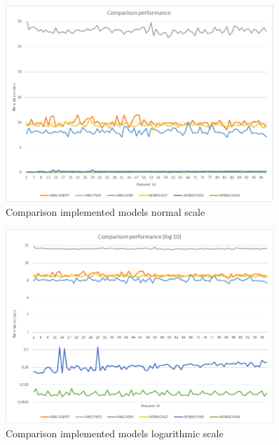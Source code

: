 \begin{figure}[h]
    \centering
    \includegraphics[width=0.9\textwidth, height=0.6\textwidth]{Img/Performance/Perf.png}
    \caption{Comparison implemented models normal scale}
\end{figure}
\begin{figure}[h]
    \centering
    \includegraphics[width=0.9\textwidth, height=0.6\textwidth]{Img/Performance/PerfLog10.png}
    \caption{Comparison implemented models logarithmic scale}
\end{figure}

